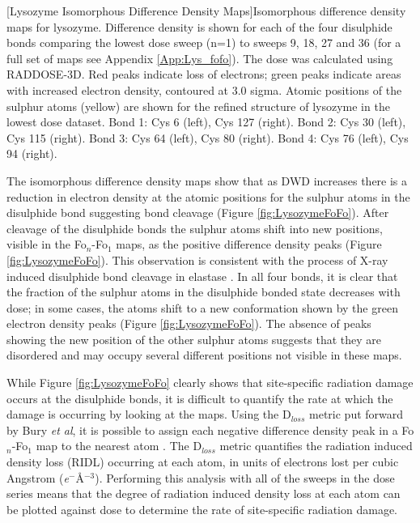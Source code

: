 \begin{minipage}{\linewidth}
	[Lysozyme Isomorphous Difference Density Maps]{Isomorphous difference density maps for lysozyme. Difference density is shown for each of the four disulphide bonds comparing the lowest dose sweep (n=1) to sweeps 9, 18, 27 and 36 (for a full set of maps see Appendix \ref{App:Lys_fofo}). The dose was calculated using RADDOSE-3D. Red peaks indicate loss of electrons; green peaks indicate areas with increased electron density, contoured at 3.0 sigma. Atomic positions of the sulphur atoms (yellow) are shown for the refined structure of lysozyme in the lowest dose dataset. Bond 1: Cys 6 (left), Cys 127 (right). Bond 2: Cys 30 (left), Cys 115 (right). Bond 3: Cys 64 (left), Cys 80 (right). Bond 4: Cys 76 (left), Cys 94 (right).    \label{fig:LysozymeFoFo}}		
\end{minipage}

The isomorphous difference density maps show that as DWD increases there is a reduction in electron density at the atomic positions for the sulphur atoms in the disulphide bond suggesting bond cleavage (Figure \ref{fig:LysozymeFoFo}). After cleavage of the disulphide bonds the sulphur atoms shift into new positions, visible in the Fo$_n$-Fo$_1$ maps, as the positive difference density peaks (Figure \ref{fig:LysozymeFoFo}). This observation is consistent with the process of X-ray induced disulphide bond cleavage in elastase \cite{Petrova2010}. In all four bonds, it is clear that the fraction of the sulphur atoms in the disulphide bonded state decreases with dose; in some cases, the atoms shift to a new conformation shown by the green electron density peaks (Figure \ref{fig:LysozymeFoFo}). The absence of peaks showing the new position of the other sulphur atoms suggests that they are disordered and may occupy several different positions not visible in these maps.

While Figure \ref{fig:LysozymeFoFo} clearly shows that site-specific radiation damage occurs at the disulphide bonds, it is difficult to quantify the rate at which the damage is occurring by looking at the maps. Using the D$_{loss}$ metric put forward by Bury \textit{et al}, it is possible to assign each negative difference density peak in a Fo$_n$-Fo$_1$ map to the nearest atom \cite{Bury2016}. The D$_{loss}$ metric quantifies the radiation induced density loss (RIDL) occurring at each atom, in units of electrons lost per cubic Angstrom (\textit{e}$^-$\si{\angstrom}$^{-3}$). Performing this analysis with all of the sweeps in the dose series means that the degree of radiation induced density loss at each atom can be plotted against dose to determine the rate of site-specific radiation damage.    


